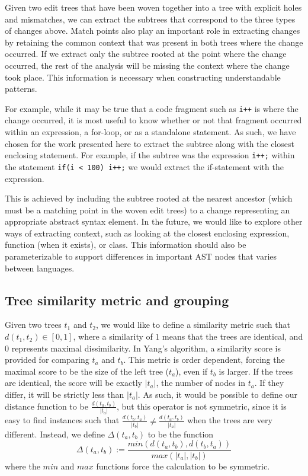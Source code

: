 Given two edit trees that have been woven together into a tree with explicit
holes and mismatches, we can extract the subtrees that correspond to the three
types of changes above.  Match points also play an important role in
extracting changes by retaining the common context that was present in both
trees where the change occurred.  If we extract only the subtree rooted at the
point where the change occurred, the rest of the analysis will be missing the
context where the change took place. This information is necessary when
constructing understandable patterns.  

For example, while it may be true that a code fragment such as {\tt i++} is
where the change occurred, it is most useful to know whether or not that
fragment occurred within an expression, a for-loop, or as a standalone
statement. As such, we have chosen for the work presented here to extract the
subtree along with the closest enclosing statement. For example, if the
subtree was the expression {\tt i++;} within the statement {\tt if(i < 100)
i++;} we would extract the if-statement with the expression.

This is achieved by including the subtree rooted at the nearest ancestor
(which must be a matching point in the woven edit trees) to a change
representing an appropriate abstract syntax element.   In the future, we would
like to explore other ways of extracting context, such as looking at the
closest enclosing expression, function (when it exists), or class.  This
information should also be parameterizable to support differences in important
AST nodes that varies between languages.

\subsection{Tree similarity metric and grouping}

Given two trees $t_1$ and $t_2$, we would like to define a similarity metric
such that $d(t_1, t_2) \in [0,1]$, where a similarity of $1$ means that the
trees are identical, and $0$ represents maximal dissimilarity.  In Yang's
algorithm, a similarity score is provided for comparing $t_a$ and $t_b$. This
metric is order dependent, forcing the maximal score to be the size of the
left tree ($t_a$), even if $t_b$ is larger.  If the trees are identical, the
score will be exactly $|t_a|$, the number of nodes in $t_a$.  If they differ,
it will be strictly less than $|t_a|$.  As such, it would be possible to define
our distance function to be $\frac{d(t_a, t_b)}{|t_a|}$, but this operator is
not symmetric, since it is easy to find instances such that $\frac{d(t_b,
t_a)}{|t_b|} \neq \frac{d(t_a, t_b)}{|t_a|}$ when the trees are very different.
Instead, we define $\Delta(t_a, t_b)$ to be the function
$$\Delta(t_a, t_b) := \frac{min(d(t_a, t_b),d(t_b, t_a))}{max(|t_a|,|t_b|)}$$
where the $min$ and $max$ functions force the calculation to be symmetric.

